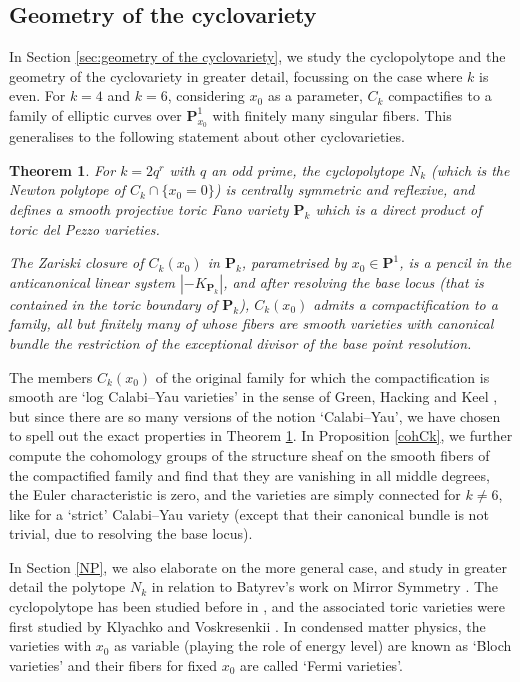 \documentclass[12pt,reqno]{amsart}
\newtheorem{introtheorem}{Theorem}
\theoremstyle{definition}
\theoremstyle{plain}
\theoremstyle{definition}
\newcommand{\PP}{\mathbf{P}}
\begin{document}
\subsection*{Geometry of the cyclovariety} 

In Section \ref{sec:geometry of the cyclovariety}, we study the cyclopolytope and the geometry of the cyclovariety in greater detail, focussing on the case where $k$ is even. For $k=4$ and $k=6$, considering $x_0$ as a parameter, $C_k$ compactifies to a family of elliptic curves over $\PP^1_{x_0}$ with finitely many singular fibers. This generalises to the following statement about other cyclovarieties. 

\begin{introtheorem} \label{mainCY}
For $k=2 q^r$ with $q$ an odd prime, the cyclopolytope $N_k$ \textup{(}which is the Newton polytope of $C_k \cap \{x_0=0\}$\textup{)} is centrally symmetric and reflexive, and defines a smooth projective toric Fano variety $\PP_k$ which is a direct product of toric del Pezzo varieties. 

The Zariski closure of $C_k(x_0)$ in $\PP_k$, parametrised by $x_0 \in \PP^1$, is a pencil in the anticanonical linear system $|-K_{\PP_k}|$, and after resolving the base locus \textup{(}that is contained in the toric boundary of $\PP_k$\textup{)}, $C_k(x_0)$ admits a compactification to a family, all but finitely many of whose fibers are smooth varieties with canonical bundle the restriction of the exceptional divisor of the base point resolution. 
\end{introtheorem}

The members $C_k(x_0)$ of the original family for which the compactification is smooth are `log Calabi--Yau varieties' in the sense of Green, Hacking and Keel \cite[Def.\ 1.1]{GHK}, but since there are so many versions of the notion `Calabi--Yau', we have chosen to spell out the exact properties in Theorem \ref{mainCY}. In Proposition \ref{cohCk}, we further compute the cohomology groups of the structure sheaf on the smooth fibers of the compactified family and find that they are vanishing in all middle degrees, the Euler characteristic is zero, and the varieties are simply connected for $k \neq 6$, like for a `strict' Calabi--Yau variety (except that their canonical bundle is not trivial, due to resolving the base locus).  


In Section \ref{NP}, we also elaborate on the more general case, and study in greater detail the polytope $N_k$ in relation to Batyrev's work on Mirror Symmetry \cite{Batyrev}.  The cyclopolytope has been studied before in \cite{BeckHosten}, and the associated toric varieties were first studied by Klyachko and Voskresenkii \cite{KlyachkoVoskresenskii}. In  condensed matter physics, the varieties with $x_0$ as variable (playing the role of energy level) are known as `Bloch varieties' and their fibers for fixed $x_0$ are called `Fermi varieties'. 
\end{document}
